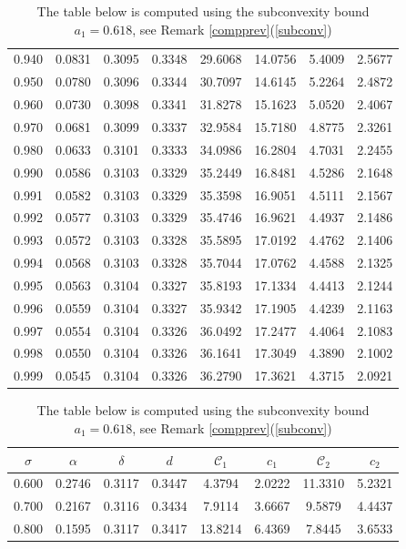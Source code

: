 \documentclass[10pt]{amsart}
\theoremstyle{definition}
\numberwithin{equation}{section}
\begin{document}
\begin{table}[h!]
\begin{tabular}{|c|c|c|c|c|c|c|c|}
0.940 & 0.0831 & 0.3095 & 0.3348 & 29.6068 & 14.0756 & 5.4009 & 2.5677 \\
0.950 & 0.0780 & 0.3096 & 0.3344 & 30.7097 & 14.6145 & 5.2264 & 2.4872 \\
0.960 & 0.0730 & 0.3098 & 0.3341 & 31.8278 & 15.1623 & 5.0520 & 2.4067 \\
0.970 & 0.0681 & 0.3099 & 0.3337 & 32.9584 & 15.7180 & 4.8775 & 2.3261 \\
0.980 & 0.0633 & 0.3101 & 0.3333 & 34.0986 & 16.2804 & 4.7031 & 2.2455 \\
0.990 & 0.0586 & 0.3103 & 0.3329 & 35.2449 & 16.8481 & 4.5286 & 2.1648 \\
0.991 & 0.0582 & 0.3103 & 0.3329 & 35.3598 & 16.9051 & 4.5111 & 2.1567 \\
0.992 & 0.0577 & 0.3103 & 0.3329 & 35.4746 & 16.9621 & 4.4937 & 2.1486 \\
0.993 & 0.0572 & 0.3103 & 0.3328 & 35.5895 & 17.0192 & 4.4762 & 2.1406 \\
0.994 & 0.0568 & 0.3103 & 0.3328 & 35.7044 & 17.0762 & 4.4588 & 2.1325 \\
0.995 & 0.0563 & 0.3104 & 0.3327 & 35.8193 & 17.1334 & 4.4413 & 2.1244 \\
0.996 & 0.0559 & 0.3104 & 0.3327 & 35.9342 & 17.1905 & 4.4239 & 2.1163 \\
0.997 & 0.0554 & 0.3104 & 0.3326 & 36.0492 & 17.2477 & 4.4064 & 2.1083 \\
0.998 & 0.0550 & 0.3104 & 0.3326 & 36.1641 & 17.3049 & 4.3890 & 2.1002 \\
0.999 & 0.0545 & 0.3104 & 0.3326 & 36.2790 & 17.3621 & 4.3715 & 2.0921 \\
\hline
\end{tabular}
\vskip6pt
\caption*{The table below is computed using the subconvexity bound $a_1=0.618$, see Remark \ref{compprev}(\ref{subconv})}
\begin{tabular}{|c|c|c|c|c|c|c|c|}
\hline
$\sigma$ & $\alpha$ & $\delta$ & $d$ & $\mathcal{C}_1$ & $c_1$ & $\mathcal{C}_2$ & $c_2$ \\
\hline
0.600 & 0.2746 & 0.3117 & 0.3447 & 4.3794 & 2.0222 & 11.3310 & 5.2321 \\
0.700 & 0.2167 & 0.3116 & 0.3434 & 7.9114 & 3.6667 & 9.5879 & 4.4437 \\
0.800 & 0.1595 & 0.3117 & 0.3417 & 13.8214 & 6.4369 & 7.8445 & 3.6533 \\

\end{tabular}
\end{table}
\end{document}
